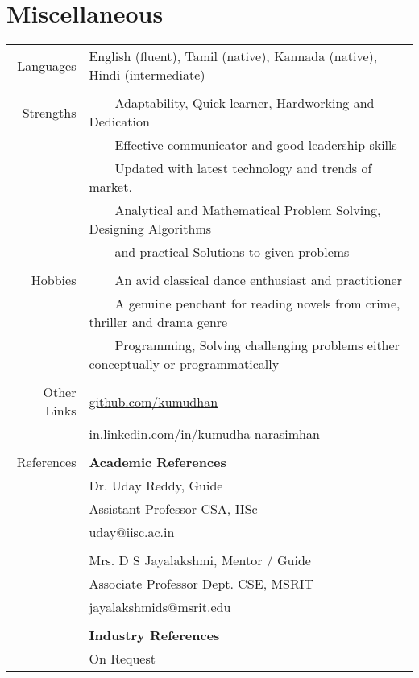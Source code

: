 \documentclass[a4paper,10pt]{article} %
\newcommand{\tabitem}{~~\llap{\textbullet}~~}
\begin{document}


\section{Miscellaneous}
\begin{tabular}{rl}
Languages & English (fluent), Tamil (native), Kannada (native), Hindi (intermediate)\\
&\\
Strengths & \tabitem Adaptability, Quick learner, Hardworking and Dedication\\
& \tabitem Effective communicator and good leadership skills \\
& \tabitem Updated with latest technology and trends of market.\\
& \tabitem Analytical and Mathematical Problem Solving, Designing Algorithms \\
& ~~~~and practical Solutions to given problems \\
& \\
Hobbies & \tabitem An avid classical dance enthusiast and practitioner\\
& \tabitem A genuine penchant for reading novels from crime, thriller and drama genre\\
& \tabitem Programming, Solving challenging problems either conceptually or programmatically \\
& \\
Other Links & \href{https://github.com/kumudhan}{github.com/kumudhan} \\
& \href{http://in.linkedin.com/in/kumudha-narasimhan}{in.linkedin.com/in/kumudha-narasimhan}\\
&\\
References & \textbf{Academic References} \\
& Dr. Uday Reddy, Guide \\
& Assistant Professor CSA, IISc\\
& uday@iisc.ac.in \\
&\\
& Mrs. D S Jayalakshmi, Mentor / Guide  \\
& Associate Professor Dept. CSE, MSRIT \\
& jayalakshmids@msrit.edu\\
&\\

& \textbf{Industry References} \\
& On Request \\
\end{tabular}
\end{document}

